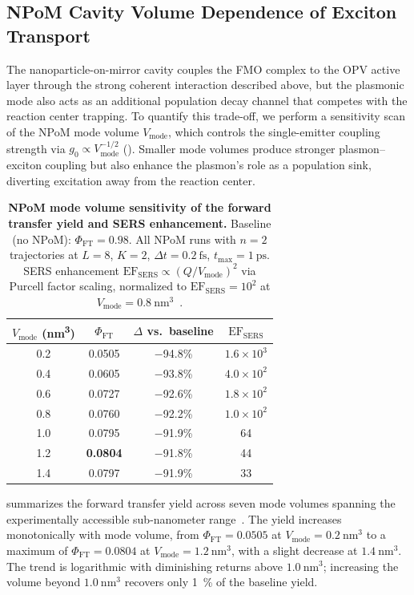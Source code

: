 \documentclass[12pt]{article}
\begin{document}
\subsection*{NPoM Cavity Volume Dependence of Exciton Transport}

The nanoparticle-on-mirror cavity couples the FMO complex to the OPV active layer through the strong coherent interaction described above, but the plasmonic mode also acts as an additional population decay channel that competes with the reaction center trapping.
To quantify this trade-off, we perform a sensitivity scan of the NPoM mode volume $V_{\mathrm{mode}}$, which controls the single-emitter coupling strength via $g_0 \propto V_{\mathrm{mode}}^{-1/2}$ ().
Smaller mode volumes produce stronger plasmon--exciton coupling but also enhance the plasmon's role as a population sink, diverting excitation away from the reaction center.

\begin{table}[htbp]
\centering
\caption{\textbf{NPoM mode volume sensitivity of the forward transfer yield and SERS enhancement.}
Baseline (no NPoM): $\Phi_{\mathrm{FT}} = 0.98$. All NPoM runs with $n=2$ trajectories at $L=8$, $K=2$, $\Delta t = \SI{0.2}{\fs}$, $t_{\mathrm{max}} = \SI{1}{\ps}$. SERS enhancement $\mathrm{EF}_{\mathrm{SERS}} \propto (Q/V_{\mathrm{mode}})^2$ via Purcell factor scaling, normalized to $\mathrm{EF}_{\mathrm{SERS}} = 10^2$ at $V_{\mathrm{mode}} = \SI{0.8}{\nm\cubed}$~\cite{Chikkaraddy2016}.}
\label{tab:npom_volume_scan}
\begin{tabular}{c c c c}
\toprule
$V_{\mathrm{mode}}$ (\si{\nm\cubed}) & $\Phi_{\mathrm{FT}}$ & $\Delta$ vs.\ baseline & $\mathrm{EF}_{\mathrm{SERS}}$ \\
\midrule
0.2  & 0.0505 & $-$94.8\% & $1.6\times10^3$ \\
0.4  & 0.0605 & $-$93.8\% & $4.0\times10^2$ \\
0.6  & 0.0727 & $-$92.6\% & $1.8\times10^2$ \\
0.8  & 0.0760 & $-$92.2\% & $1.0\times10^2$ \\
1.0  & 0.0795 & $-$91.9\% & 64 \\
1.2  & \textbf{0.0804} & $-$91.8\% & 44 \\
1.4  & 0.0797 & $-$91.9\% & 33 \\
\bottomrule
\end{tabular}
\end{table}

 summarizes the forward transfer yield across seven mode volumes spanning the experimentally accessible sub-nanometer range~\cite{Chikkaraddy2016}.
The yield increases monotonically with mode volume, from $\Phi_{\mathrm{FT}} = 0.0505$ at $V_{\mathrm{mode}} = \SI{0.2}{\nm\cubed}$ to a maximum of $\Phi_{\mathrm{FT}} = 0.0804$ at $V_{\mathrm{mode}} = \SI{1.2}{\nm\cubed}$, with a slight decrease at $\SI{1.4}{\nm\cubed}$.
The trend is logarithmic with diminishing returns above $\SI{1.0}{\nm\cubed}$; increasing the volume beyond $\SI{1.0}{\nm\cubed}$ recovers only \SI{1}{\percent} of the baseline yield.
\end{document}
